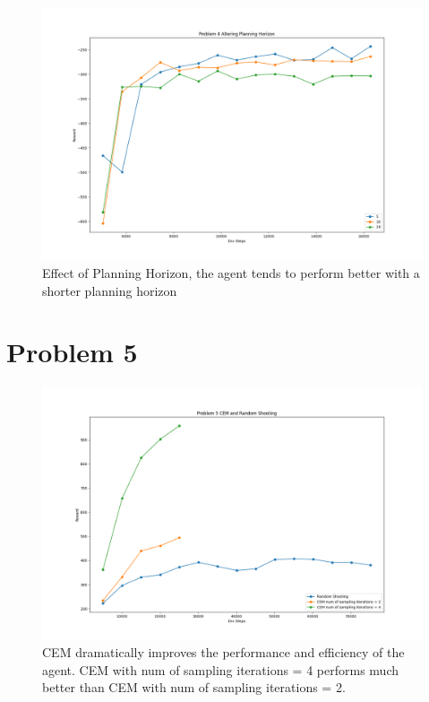 \documentclass[10pt]{report}
\begin{document}
\begin{figure}[h]
	\includegraphics[width=\textwidth]{figures/Problem 4/Problem 4 horizon.png}
	\caption{Effect of Planning Horizon, the agent tends to perform better with a shorter planning horizon}
\end{figure}


\newpage
\section*{Problem 5}
\begin{figure}[h]
	\includegraphics[width=\textwidth]{figures/Problem 5/Problem 5 cem.png}
	\caption{CEM dramatically improves the performance and efficiency of the agent. CEM with num of sampling iterations = 4 performs much better than CEM with num of sampling iterations = 2.}
\end{figure}
\end{document}
